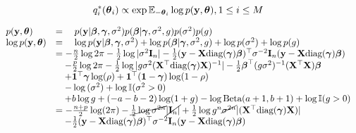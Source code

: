 \documentclass{amsart}[12pt]
\begin{document}
\begin{equation*}
	q_i^*({\boldsymbol \theta}_i) \propto \exp{ {\mathbb E}_{-{\boldsymbol\theta}_i} \log{p({\bf y}, {\boldsymbol\theta})} }, 1 \leq i \leq M
\end{equation*}

\begin{equation*}
	\begin{array}{ll}
		p({\bf y}, {\boldsymbol \theta})       & = \quad p({\bf y} | {\boldsymbol \beta}, {\boldsymbol \gamma}, \sigma^2) p({\boldsymbol \beta} | {\boldsymbol \gamma}, \sigma^2, g) p(\sigma^2) p(g)                                                                                    \\
		\log{p({\bf y}, {\boldsymbol\theta})} & = \quad \log{p({\bf y}| {\boldsymbol\beta}, {\boldsymbol\gamma}, \sigma^2)} + \log{p({\boldsymbol\beta}| {\boldsymbol\gamma}, \sigma^2, g)} + \log{p(\sigma^2)} + \log{p(g)}                                                      \\
		                      & = -\frac{n}{2} \log{2 \pi} -\tfrac{1}{2} \log |\sigma^2 {\bf I}_n| - \tfrac{1}{2} ({\bf y} - {\bf X} \text{diag}({\boldsymbol \gamma}) {\boldsymbol \beta})^\top \sigma^{-2} {\bf I}_n ({\bf y} - {\bf X} \text{diag}({\boldsymbol \gamma}) {\boldsymbol \beta})          \\
		                      & \quad -\frac{p}{2} \log{2 \pi} - \tfrac{1}{2} \log |g \sigma^2 ({\bf X}^\top \text{diag}({\boldsymbol \gamma}) {\bf X})^{-1}| -                                                                             
		\tfrac{1}{2} {\boldsymbol \beta}^\top (g \sigma^2)^{-1} ({\bf X}^\top {\bf X}) {\boldsymbol \beta} \\
		                      & \quad + {\bf 1}^\top {\boldsymbol\gamma} \log(\rho) + {\bf 1}^\top ({\bf 1} - {\boldsymbol \gamma}) \log(1 - \rho)                                                                                             \\
		                      & \quad - \log{(\sigma^2)} + \log {\mathbb I} (\sigma^2 > 0)                                                                                                                              \\
		                      & \quad + b \log g + (-a - b - 2) \log(1 + g) - \log \text{Beta}(a + 1,  b + 1) + \log {\mathbb I}(g > 0)                                                                                 \\
		                      & = -\frac{n + p}{2} \log(2 \pi) - \cancel{\tfrac{1}{2} \log{\sigma^{2n}}} \cancel{|{\bf I}_n|}                                                                                              
		+\tfrac{1}{2} \log{g^n \cancel{\sigma^{2n}}} |({\bf X}^\top \text{diag}({\boldsymbol \gamma}) {\bf X})| \\
		                      & \quad		-\tfrac{1}{2} ({\bf y} - {\bf X} \text{diag}({\boldsymbol \gamma}) {\boldsymbol \beta})^\top \sigma^{-2} {\bf I}_n ({\bf y} - {\bf X} \text{diag}({\boldsymbol \gamma}) {\boldsymbol \beta})                                                            \\

\end{array}
\end{equation*}
\end{document}
